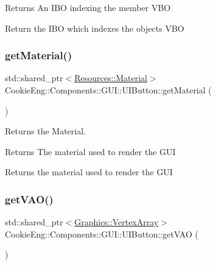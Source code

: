 \begin{DoxyReturn}{Returns}
An I\+BO indexing the member V\+BO
\end{DoxyReturn}
Return the I\+BO which indexes the objects V\+BO \mbox{\label{class_cookie_eng_1_1_components_1_1_g_u_i_1_1_u_i_button_a7f77d231424f159a9ce6e5f77a594045}} 
\subsubsection{\texorpdfstring{get\+Material()}{getMaterial()}}
{\footnotesize\ttfamily std\+::shared\+\_\+ptr$<$\hyperlink{class_cookie_eng_1_1_resources_1_1_material}{Resources\+::\+Material}$>$ Cookie\+Eng\+::\+Components\+::\+G\+U\+I\+::\+U\+I\+Button\+::get\+Material (\begin{DoxyParamCaption}{ }\end{DoxyParamCaption})\hspace{0.3cm}{\ttfamily [inline]}}



Returns the Material. 

\begin{DoxyReturn}{Returns}
The material used to render the G\+UI
\end{DoxyReturn}
Returns the material used to render the G\+UI \mbox{\label{class_cookie_eng_1_1_components_1_1_g_u_i_1_1_u_i_button_a78dc9404b74f95f9ceb48f9f92655493}} 
\subsubsection{\texorpdfstring{get\+V\+A\+O()}{getVAO()}}
{\footnotesize\ttfamily std\+::shared\+\_\+ptr$<$\hyperlink{class_cookie_eng_1_1_graphics_1_1_vertex_array}{Graphics\+::\+Vertex\+Array}$>$ Cookie\+Eng\+::\+Components\+::\+G\+U\+I\+::\+U\+I\+Button\+::get\+V\+AO (\begin{DoxyParamCaption}{ }\end{DoxyParamCaption})\hspace{0.3cm}{\ttfamily [inline]}}



